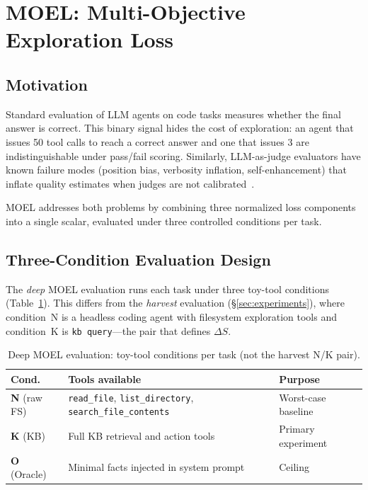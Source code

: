 \section{MOEL: Multi-Objective Exploration Loss}
\label{sec:moel}

\subsection{Motivation}

Standard evaluation of LLM agents on code tasks measures whether the final
answer is correct.  This binary signal hides the cost of exploration: an agent
that issues 50 tool calls to reach a correct answer and one that issues 3 are
indistinguishable under pass/fail scoring.  Similarly, LLM-as-judge evaluators
have known failure modes (position bias, verbosity inflation, self-enhancement)
that inflate quality estimates when judges are not calibrated~\cite{zheng2023judging}.

MOEL addresses both problems by combining three normalized loss components into a
single scalar, evaluated under three controlled conditions per task.

\subsection{Three-Condition Evaluation Design}
\label{subsec:conditions}

The \emph{deep} MOEL evaluation runs each task under three toy-tool conditions
(Table~\ref{tab:moel-conditions}).  This differs from the \emph{harvest}
evaluation (\S\ref{sec:experiments}), where condition~N is a headless coding
agent with filesystem exploration tools and condition~K is \texttt{kb query}---the
pair that defines $\Delta S$.

\begin{table}[h]
\centering\small
\caption{Deep MOEL evaluation: toy-tool conditions per task (not the harvest N/K pair).}
\label{tab:moel-conditions}
\begin{tabular}{@{}p{1.6cm}p{3.4cm}p{1.6cm}@{}}
\toprule
\textbf{Cond.} & \textbf{Tools available} & \textbf{Purpose} \\
\midrule
\textbf{N} (raw FS) &
  {\footnotesize\texttt{read\_file}, \texttt{list\_directory},
  \texttt{search\_file\_contents}} &
  Worst-case baseline \\[3pt]
\textbf{K} (KB) &
  Full KB retrieval and action tools &
  Primary experiment \\[3pt]
\textbf{O} (Oracle) &
  Minimal facts injected in system prompt &
  Ceiling \\
\bottomrule
\end{tabular}
\end{table}

